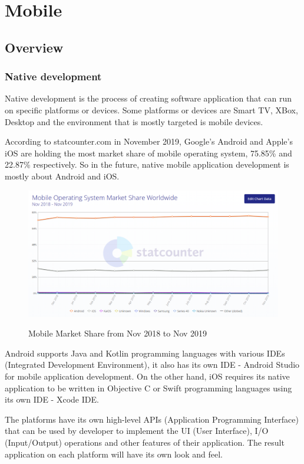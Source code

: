 \newpage
\section{Mobile}
\subsection{Overview}

\subsubsection{Native development}
\par{
    Native development is the process of creating software application that can run on specific platforms or devices.
    Some platforms or devices are Smart TV, XBox, Desktop and the environment that is mostly targeted is mobile devices.

    According to statcounter.com in November 2019, Google's Android and Apple's iOS are holding the most market share of
    mobile operating system, 75.85\% and 22.87\% respectively. So in the future, native mobile application development is mostly about Android and iOS.

    \begin{figure}[!ht]
        \centering
        \includegraphics[scale=0.3]{Picture/mobile/mobile_market_share.png}
        \label{fig:logo}
        \caption{Mobile Market Share from Nov 2018 to Nov 2019}
    \end{figure}

    Android supports Java and Kotlin programming languages with various IDEs (Integrated Development Environment), it also has its own IDE - Android Studio for mobile application development.
    On the other hand, iOS requires its native application to be written in Objective C or Swift programming languages using its own IDE - Xcode IDE.

    The platforms have its own high-level APIs (Application Programming Interface) that can be used by developer to implement the UI (User Interface), I/O (Input/Output) operations and other features of their application.
    The result application on each platform will have its own look and feel.
}
